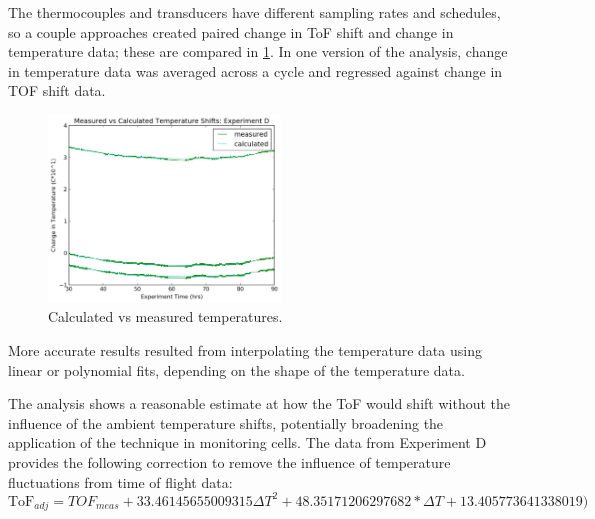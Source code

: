 The thermocouples and transducers have different sampling rates and schedules, so a couple approaches created paired change in ToF shift and change in temperature data; these are compared in \hyperref[fig:0417temp]{\cref{fig:0417temp}}. 
In one version of the analysis, change in temperature data was averaged across a cycle and regressed against change in TOF shift data. 
\begin{figure}[t]\label{fig:0417temp}
    \includegraphics[width=0.55\textwidth]{0417temp.png}
    \centering
    \caption{Calculated vs measured temperatures.}
\end{figure}
More accurate results resulted from interpolating the temperature data using linear or polynomial fits, depending on the shape of the temperature data.

The analysis shows a reasonable estimate at how the ToF would shift without the influence of the ambient temperature shifts, potentially broadening the application of the technique in monitoring cells. The data from Experiment D provides the following correction to remove the influence of temperature fluctuations from time of flight data:
$$ \text{ToF}_{adj} = TOF_{meas} + 33.46145655009315\Delta T^2 + 48.35171206297682*\Delta T + 13.405773641338019)$$

